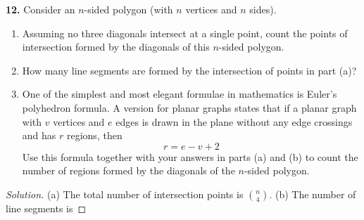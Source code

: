 \documentclass[12pt]{amsart}
\newenvironment{solution}
{\begin{proof}[Solution]}
{\end{proof}}
\begin{document}
\begin{onehalfspace}
        \noindent\textbf{12.} Consider an $n$-sided polygon (with $n$ vertices and $n$ sides).
        \begin{enumerate}[label=(\alph*)]
            \item Assuming no three diagonals intersect at a single point, count the points of intersection formed by
                  the diagonals of this $n$-sided polygon.
            \item How many line segments are formed by the intersection of points in part (a)?
            \item One of the simplest and most elegant formulae in mathematics is Euler's polyhedron formula.
                  A version for planar graphs states that if a planar graph with $v$ vertices and $e$ edges is drawn in
                  the plane without any edge crossings and has $r$ regions, then
                  \begin{displaymath}
                      r = e - v + 2
                  \end{displaymath}
                  Use this formula together with your answers in parts (a) and (b) to count the number of regions
                  formed by the diagonals of the $n$-sided polygon.
        \end{enumerate}
        \begin{solution}
            (a) The total number of intersection points is $\binom{n}{4}$.
            (b) The number of line segments is
        \end{solution}


\end{onehalfspace}
\end{document}
